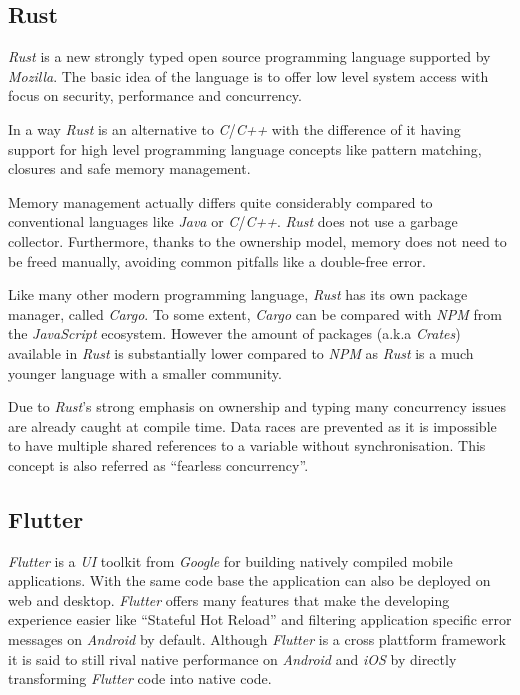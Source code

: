 \subsection{Rust}

\textit{Rust} is a new strongly typed open source programming language supported by
\textit{Mozilla}. The basic idea of the language is to offer low level system access with focus on
security, performance and concurrency. \cite{rustbook1, forkjoin}

In a way \textit{Rust} is an alternative to \textit{C}/\textit{C++} with the difference of it having
support for high level programming language concepts like pattern matching, closures and safe memory
management. \cite{rustbook1, forkjoin}

Memory management actually differs quite considerably compared to conventional languages like
\textit{Java} or \textit{C}/\textit{C++}. \textit{Rust} does not use a garbage collector.
Furthermore, thanks to the ownership model, memory does not need to be freed manually, avoiding
common pitfalls like a double-free error.

Like many other modern programming language, \textit{Rust} has its own package manager, called
\textit{Cargo}. To some extent, \textit{Cargo} can be compared with \textit{NPM} from the
\textit{JavaScript} ecosystem. However the amount of packages (a.k.a \textit{Crates}) available in
\textit{Rust} is substantially lower compared to \textit{NPM} as \textit{Rust} is a much younger
language with a smaller community.

Due to \textit{Rust}'s strong emphasis on ownership and typing many concurrency issues are already
caught at compile time. Data races are prevented as it is impossible to have multiple shared
references to a variable without synchronisation. This concept is also referred as “fearless
concurrency”. \cite{rustbook2}

\subsection{Flutter}

\textit{Flutter} is a \textit{UI} toolkit from \textit{Google} for building natively compiled mobile
applications. With the same code base the application can also be deployed on web and desktop.
\textit{Flutter} offers many features that make the developing experience easier like “Stateful Hot
Reload” and filtering application specific error messages on \textit{Android} by default. Although
\textit{Flutter} is a cross plattform framework it is said to still rival native performance on
\textit{Android} and \textit{iOS} by directly transforming \textit{Flutter} code into native code.
\cite{flutter}

